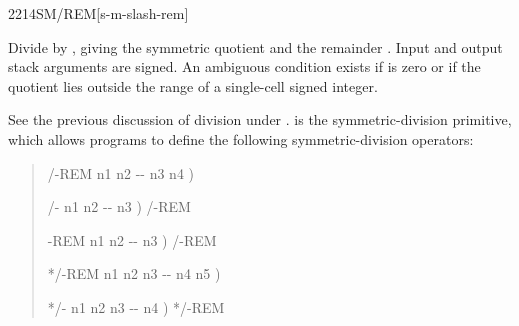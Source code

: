 \begin{worddef}{2214}{SM/REM}[s-m-slash-rem]
\item {}

	Divide  by , giving the symmetric quotient
	 and the remainder . Input and output stack
	arguments are signed. An ambiguous condition exists if 
	is zero or if the quotient lies outside the range of a single-cell
	signed integer.


	\begin{rationale} %
		See the previous discussion of division under .
		 is the symmetric-division primitive, which allows
		programs to define the following symmetric-division operators:

		\begin{quote}\ttfamily
			\word{:} /-REM  n1 n2 -{}- n3 n4 )
				   
			\word{;}

			\word{:} /-  n1 n2 -{}- n3 )
				/-REM  
			\word{;}

			\word{:} -REM  n1 n2 -{}- n3 )
				/-REM 
			\word{;}

			\word{:} */-REM  n1 n2 n3 -{}- n4 n5 )
				   
			\word{;}

			\word{:} */-  n1 n2 n3 -{}- n4 )
				*/-REM  
			\word{;}
		\end{quote}
	\end{rationale}


\end{worddef}
